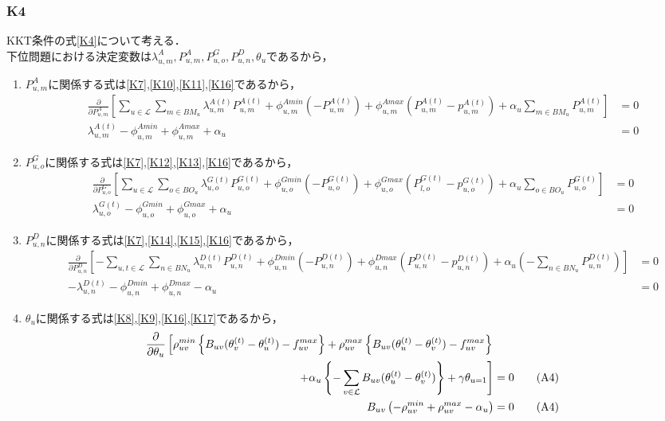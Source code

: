 \documentclass[a4j,10.5pt]{jarticle}
\begin{document}
\subsubsection{K4}
KKT条件の式\ref{K4}について考える．\\
下位問題における決定変数は$\lambda_{u,m}^{A},P_{u,m}^A,P_{u,o}^G,P_{u,n}^D,\theta_u$であるから，
\begin{enumerate}
\item $P_{u,m}^A$に関係する式は\ref{K7},\ref{K10},\ref{K11},\ref{K16}であるから，
\begin{align}
&\frac{\partial}{\partial P_{u,m}^A}\left[\sum_{u\in \mathcal{L}}\sum_{m\in BM_u}\lambda^{A(t)}_{u,m}P^{A(t)}_{u,m}+\phi_{u,m}^{Amin}(-P_{u,m}^{A(t)})+\phi_{u,m}^{Amax}(P_{u,m}^{A(t)}-p_{u,m}^{A(t)})+\alpha_u\sum_{m\in BM_u}P^{A(t)}_{u,m}\right]&=0\tag{A1}\\
&\lambda^{A(t)}_{u,m}-\phi_{u,m}^{Amin}+\phi_{u,m}^{Amax}+\alpha_u&=0\tag{A1}\label{A1}
\end{align}
\item $P_{u,o}^G$に関係する式は\ref{K7},\ref{K12},\ref{K13},\ref{K16}であるから，
\begin{align}
&\frac{\partial}{\partial P_{u,o}^G}\left[\sum_{u\in \mathcal{L}}\sum_{o\in BO_u}\lambda^{G(t)}_{u,o}P^{G(t)}_{u,o}+\phi_{u,o}^{Gmin}(-P_{u,o}^{G(t)})+\phi_{u,o}^{Gmax}(P_{l,o}^{G(t)}-p_{u,o}^{G(t)})+\alpha_u\sum_{o\in BO_u}P^{G(t)}_{u,o}\right]&=0\tag{A2}\\
&\lambda^{G(t)}_{u,o}-\phi_{u,o}^{Gmin}+\phi_{u,o}^{Gmax}+\alpha_u&=0\tag{A2}\label{A2}
\end{align}
\item $P_{u,n}^D$に関係する式は\ref{K7},\ref{K14},\ref{K15},\ref{K16}であるから，
\begin{align}
&\frac{\partial}{\partial P_{u,n}^D}\left[-\sum_{u,t\in \mathcal{L}}\sum_{n\in BN_u}\lambda^{D(t)}_{u,n}P^{D(t)}_{u,n}+\phi_{u,n}^{Dmin}(-P_{u,n}^{D(t)})+\phi_{u,n}^{Dmax}(P_{u,n}^{D(t)}-p_{u,n}^{D(t)})+\alpha_u(-\sum_{n\in BN_u}P^{D(t)}_{u,n})\right]&=0\tag{A3}\\
&-\lambda^{D(t)}_{u,n}-\phi_{u,n}^{Dmin}+\phi_{u,n}^{Dmax}-\alpha_u&=0\label{A3}\tag{A3}
\end{align}
\item $\theta_u$に関係する式は\ref{K8},\ref{K9},\ref{K16},\ref{K17}であるから，
\begin{align}
\frac{\partial}{\partial \theta_u}\left[\rho_{uv}^{min}\left\{ B_{uv}(\theta_v^{(t)}-\theta_u^{(t)})-f_{uv}^{max}\right\}+\rho_{uv}^{max}\left\{ B_{uv}(\theta_u^{(t)}-\theta_v^{(t)})-f_{uv}^{max}\right\}\notag \right. \\
\left.+\alpha_u\left\{-\sum_{v\in \mathcal{L}}B_{uv}(\theta_u^{(t)}-\theta_v^{(t)})\right\}+\gamma\theta_{u=1} \right]&=0\tag{A4}\\
B_{uv}\left(-\rho_{uv}^{min}+\rho_{uv}^{max}-\alpha_u\right)&=0\label{A4}\tag{A4}
\end{align}
\end{enumerate}
\end{document}
